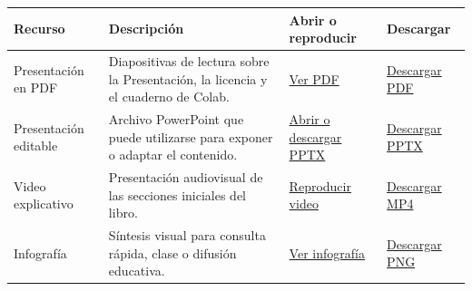 \documentclass[
  spanish,
  10.5pt,
  letterpaper,
  openany,
  headings=big]{scrbook}
\newcounter{none} %
\begin{document}
{\def\LTcaptype{none} %
\begin{longtable}[]{@{}
  >{\raggedright\arraybackslash}p{}
  >{\raggedright\arraybackslash}p{}
  >{\raggedright\arraybackslash}p{}
  >{\raggedright\arraybackslash}p{}@{}}
\toprule\noalign{}
\begin{minipage}[b]{\linewidth}\raggedright
Recurso
\end{minipage} & \begin{minipage}[b]{\linewidth}\raggedright
Descripción
\end{minipage} & \begin{minipage}[b]{\linewidth}\raggedright
Abrir o reproducir
\end{minipage} & \begin{minipage}[b]{\linewidth}\raggedright
Descargar
\end{minipage} \\
\midrule\noalign{}
\endhead
\bottomrule\noalign{}
\endlastfoot
Presentación en PDF & Diapositivas de lectura sobre la Presentación, la
licencia y el cuaderno de Colab. &
\href{recursos/presentacion-licencia-cuaderno.pdf}{Ver PDF} &
\href{recursos/presentacion-licencia-cuaderno.pdf}{Descargar PDF} \\
Presentación editable & Archivo PowerPoint que puede utilizarse para
exponer o adaptar el contenido. &
\href{recursos/presentacion-licencia-cuaderno.pptx}{Abrir o descargar
PPTX} & \href{recursos/presentacion-licencia-cuaderno.pptx}{Descargar
PPTX} \\
Video explicativo & Presentación audiovisual de las secciones iniciales
del libro. &
\href{recursos/video-presentacion-licencia-cuaderno.mp4}{Reproducir
video} &
\href{recursos/video-presentacion-licencia-cuaderno.mp4}{Descargar
MP4} \\
Infografía & Síntesis visual para consulta rápida, clase o difusión
educativa. &
\href{recursos/infografia-presentacion-licencia-cuaderno.png}{Ver
infografía} &
\href{recursos/infografia-presentacion-licencia-cuaderno.png}{Descargar
PNG} \\
\end{longtable}
}
\end{document}
